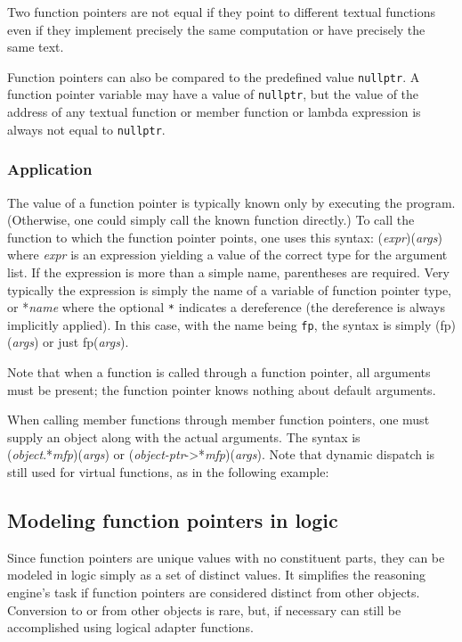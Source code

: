 Two function pointers are not equal if they point to 
different textual functions even if they implement precisely the
same computation or have precisely the same text.

Function pointers can also be compared to the predefined value \lstinline|nullptr|. A function pointer variable may have
a value of \lstinline|nullptr|, but the value of the address
of any textual function or member function or lambda expression
 is always not
equal to \lstinline|nullptr|.

\subsubsection{Application}

The value of a function pointer is typically known only by
executing the program. (Otherwise, one could simply call the
known function directly.) To call the function to which the
function pointer points, one uses this syntax:
(\emph{expr})(\emph{args}) where \emph{expr} is an expression yielding a value of the correct type for the argument list. If the expression is
more than a simple name, parentheses are required.
Very typically the expression is simply the name of a variable of function pointer type, or *\emph{name} where the optional \lstinline|*| indicates a dereference (the dereference is always implicitly applied).
In this case, with the name being \lstinline|fp|, the syntax is simply (fp)(\emph{args}) or just
fp(\emph{args}).

Note that when a function is called through a function pointer, all arguments must be present; the function pointer knows nothing about
default arguments.

When calling member functions through member function pointers, one must supply an object along with the actual arguments. The syntax is \\
(\emph{object}.*\emph{mfp})(\emph{args}) or
(\emph{object-ptr}->*\emph{mfp})(\emph{args}).
Note that dynamic dispatch is still used for virtual functions,
as in the following example:


\subsection{Modeling function pointers in logic}
\label{sec:modelingfp}
 
 Since function pointers are unique values with no constituent parts, they can be modeled in logic simply as a set of distinct values. It simplifies the reasoning engine's task if
 function pointers are considered distinct from other objects.
 Conversion to or from other objects is rare, but, if necessary can still be accomplished using logical adapter functions.
 
